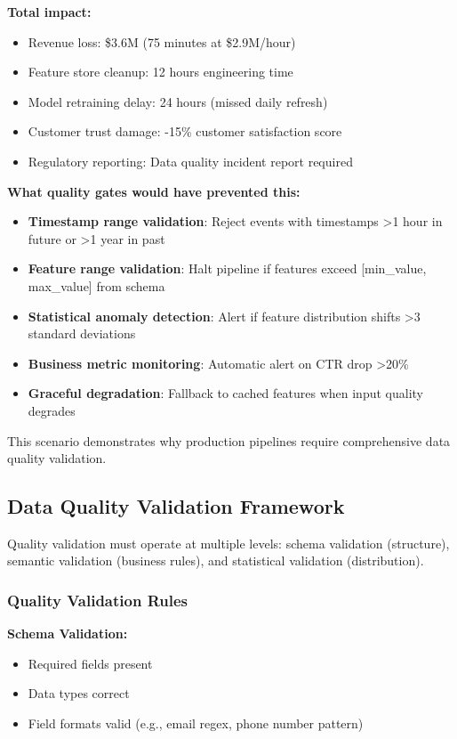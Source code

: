 \textbf{Total impact:}
\begin{itemize}
    \item Revenue loss: \$3.6M (75 minutes at \$2.9M/hour)
    \item Feature store cleanup: 12 hours engineering time
    \item Model retraining delay: 24 hours (missed daily refresh)
    \item Customer trust damage: -15\% customer satisfaction score
    \item Regulatory reporting: Data quality incident report required
\end{itemize}

\textbf{What quality gates would have prevented this:}
\begin{itemize}
    \item \textbf{Timestamp range validation}: Reject events with timestamps >1 hour in future or >1 year in past
    \item \textbf{Feature range validation}: Halt pipeline if features exceed [min\_value, max\_value] from schema
    \item \textbf{Statistical anomaly detection}: Alert if feature distribution shifts >3 standard deviations
    \item \textbf{Business metric monitoring}: Automatic alert on CTR drop >20\%
    \item \textbf{Graceful degradation}: Fallback to cached features when input quality degrades
\end{itemize}

This scenario demonstrates why production pipelines require comprehensive data quality validation.

\subsection{Data Quality Validation Framework}

Quality validation must operate at multiple levels: schema validation (structure), semantic validation (business rules), and statistical validation (distribution).

\subsubsection{Quality Validation Rules}

\textbf{Schema Validation:}
\begin{itemize}
    \item Required fields present
    \item Data types correct
    \item Field formats valid (e.g., email regex, phone number pattern)
\end{itemize}

